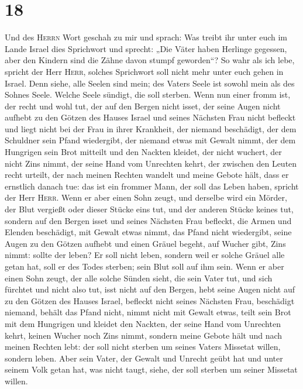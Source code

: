 \hypertarget{section-17}{%
\section{18}\label{section-17}}

 Und des \textsc{Herrn} Wort geschah zu mir und sprach:
 Was treibt ihr unter euch im Lande Israel dies Sprichwort
und sprecht: „Die Väter haben Herlinge gegessen, aber den Kindern sind
die Zähne davon stumpf geworden``?  So wahr als ich lebe,
spricht der Herr \textsc{Herr}, solches Sprichwort soll nicht mehr unter
euch gehen in Israel.  Denn siehe, alle Seelen sind mein;
des Vaters Seele ist sowohl mein als des Sohnes Seele. Welche Seele
sündigt, die soll sterben.  Wenn nun einer fromm ist, der
recht und wohl tut,  der auf den Bergen nicht isset, der
seine Augen nicht aufhebt zu den Götzen des Hauses Israel und seines
Nächsten Frau nicht befleckt und liegt nicht bei der Frau in ihrer
Krankheit,  der niemand beschädigt, der dem Schuldner sein
Pfand wiedergibt, der niemand etwas mit Gewalt nimmt, der dem Hungrigen
sein Brot mitteilt und den Nackten kleidet,  der nicht
wuchert, der nicht Zins nimmt, der seine Hand vom Unrechten kehrt, der
zwischen den Leuten recht urteilt,  der nach meinen
Rechten wandelt und meine Gebote hält, dass er ernstlich danach tue: das
ist ein frommer Mann, der soll das Leben haben, spricht der Herr
\textsc{Herr}.  Wenn er aber einen Sohn zeugt, und
derselbe wird ein Mörder, der Blut vergießt oder dieser Stücke eins tut,
 und der anderen Stücke keines tut, sondern auf den
Bergen isset und seines Nächsten Frau befleckt,  die
Armen und Elenden beschädigt, mit Gewalt etwas nimmt, das Pfand nicht
wiedergibt, seine Augen zu den Götzen aufhebt und einen Gräuel begeht,
 auf Wucher gibt, Zins nimmt: sollte der leben? Er soll
nicht leben, sondern weil er solche Gräuel alle getan hat, soll er des
Todes sterben; sein Blut soll auf ihm sein.  Wenn er aber
einen Sohn zeugt, der alle solche Sünden sieht, die sein Vater tut, und
sich fürchtet und nicht also tut,  isst nicht auf den
Bergen, hebt seine Augen nicht auf zu den Götzen des Hauses Israel,
befleckt nicht seines Nächsten Frau,  beschädigt niemand,
behält das Pfand nicht, nimmt nicht mit Gewalt etwas, teilt sein Brot
mit dem Hungrigen und kleidet den Nackten,  der seine
Hand vom Unrechten kehrt, keinen Wucher noch Zins nimmt, sondern meine
Gebote hält und nach meinen Rechten lebt: der soll nicht sterben um
seines Vaters Missetat willen, sondern leben.  Aber sein
Vater, der Gewalt und Unrecht geübt hat und unter seinem Volk getan hat,
was nicht taugt, siehe, der soll sterben um seiner Missetat willen.


